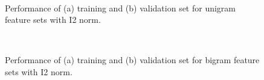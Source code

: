 \documentclass[11pt]{article}
\begin{document}
\begin{figure}[!h]
  \centering 
	\\%
  \caption{Performance of (a) training and (b) validation set for unigram feature sets with I2 norm.}
  \label{fig:I2_unigram}
\end{figure}

\begin{figure}[!h]
  \centering 
	\\%
  \caption{Performance of (a) training and (b) validation set for bigram feature sets with I2 norm.}
  \label{fig:I2_bigram}
\end{figure}
\end{document}
